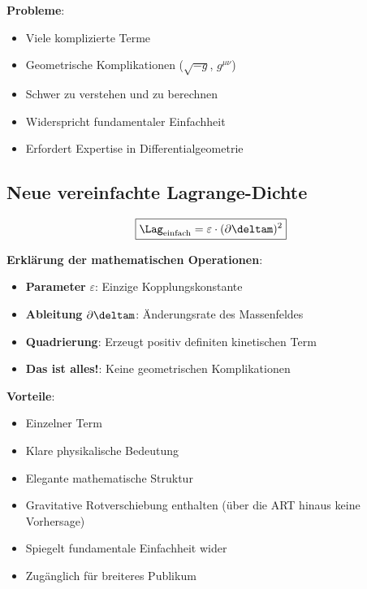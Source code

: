 	\textbf{Probleme}:
	\begin{itemize}
		\item Viele komplizierte Terme
		\item Geometrische Komplikationen ($\sqrt{-g}$, $g^{\mu\nu}$)
		\item Schwer zu verstehen und zu berechnen
		\item Widerspricht fundamentaler Einfachheit
		\item Erfordert Expertise in Differentialgeometrie
	\end{itemize}
	
	\subsection{Neue vereinfachte Lagrange-Dichte}
	
	\begin{equation}
		\boxed{\Lag_{\text{einfach}} = \varepsilon \cdot (\partial \deltam)^2}
	\end{equation}
	
	\textbf{Erklärung der mathematischen Operationen}:
	\begin{itemize}
		\item \textbf{Parameter} $\varepsilon$: Einzige Kopplungskonstante
		\item \textbf{Ableitung} $\partial \deltam$: Änderungsrate des Massenfeldes
		\item \textbf{Quadrierung}: Erzeugt positiv definiten kinetischen Term
		\item \textbf{Das ist alles!}: Keine geometrischen Komplikationen
	\end{itemize}
	
	\textbf{Vorteile}:
	\begin{itemize}
		\item Einzelner Term
		\item Klare physikalische Bedeutung
		\item Elegante mathematische Struktur
		\item Gravitative Rotverschiebung enthalten (über die ART hinaus keine Vorhersage)
		\item Spiegelt fundamentale Einfachheit wider
		\item Zugänglich für breiteres Publikum
	\end{itemize}
	
